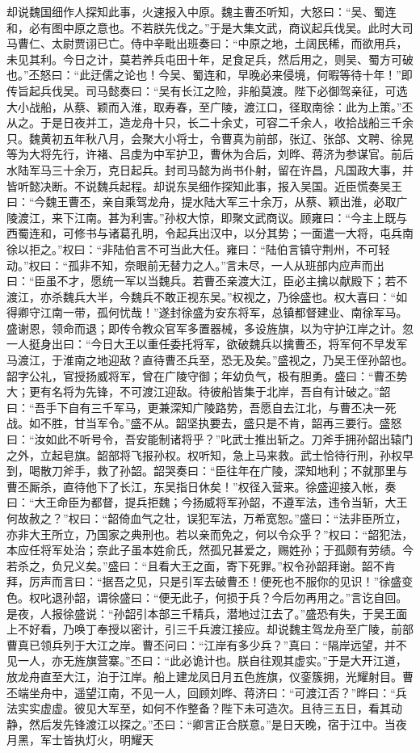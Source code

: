 却说魏国细作人探知此事，火速报入中原。魏主曹丕听知，大怒曰：“吴、蜀连和，必有图中原之意也。不若朕先伐之。”于是大集文武，商议起兵伐吴。此时大司马曹仁、太尉贾诩已亡。侍中辛毗出班奏曰：“中原之地，土阔民稀，而欲用兵，未见其利。今日之计，莫若养兵屯田十年，足食足兵，然后用之，则吴、蜀方可破也。”丕怒曰：“此迂儒之论也！今吴、蜀连和，早晚必来侵境，何暇等待十年！”即传旨起兵伐吴。司马懿奏曰：“吴有长江之险，非船莫渡。陛下必御驾亲征，可选大小战船，从蔡、颖而入淮，取寿春，至广陵，渡江口，径取南徐：此为上策。”丕从之。于是日夜并工，造龙舟十只，长二十余丈，可容二千余人，收拾战船三千余只。魏黄初五年秋八月，会聚大小将士，令曹真为前部，张辽、张郃、文聘、徐晃等为大将先行，许褚、吕虔为中军护卫，曹休为合后，刘晔、蒋济为参谋官。前后水陆军马三十余万，克日起兵。封司马懿为尚书仆射，留在许昌，凡国政大事，并皆听懿决断。不说魏兵起程。却说东吴细作探知此事，报入吴国。近臣慌奏吴王曰：“今魏王曹丕，亲自乘驾龙舟，提水陆大军三十余万，从蔡、颖出淮，必取广陵渡江，来下江南。甚为利害。”孙权大惊，即聚文武商议。顾雍曰：“今主上既与西蜀连和，可修书与诸葛孔明，令起兵出汉中，以分其势；一面遣一大将，屯兵南徐以拒之。”权曰：“非陆伯言不可当此大任。雍曰：“陆伯言镇守荆州，不可轻动。”权曰：“孤非不知，奈眼前无替力之人。”言未尽，一人从班部内应声而出曰：“臣虽不才，愿统一军以当魏兵。若曹丕亲渡大江，臣必主擒以献殿下；若不渡江，亦杀魏兵大半，今魏兵不敢正视东吴。”权视之，乃徐盛也。权大喜曰：“如得卿守江南一带，孤何忧哉！”遂封徐盛为安东将军，总镇都督建业、南徐军马。盛谢恩，领命而退；即传令教众官军多置器械，多设旌旗，以为守护江岸之计。忽一人挺身出曰：“今日大王以重任委托将军，欲破魏兵以擒曹丕，将军何不早发军马渡江，于淮南之地迎敌？直待曹丕兵至，恐无及矣。”盛视之，乃吴王侄孙韶也。韶字公礼，官授扬威将军，曾在广陵守御；年幼负气，极有胆勇。盛曰：“曹丕势大；更有名将为先锋，不可渡江迎敌。待彼船皆集于北岸，吾自有计破之。”韶曰：“吾手下自有三千军马，更兼深知广陵路势，吾愿自去江北，与曹丕决一死战。如不胜，甘当军令。”盛不从。韶坚执要去，盛只是不肯，韶再三要行。盛怒曰：“汝如此不听号令，吾安能制诸将乎？”叱武士推出斩之。刀斧手拥孙韶出辕门之外，立起皂旗。韶部将飞报孙权。权听知，急上马来救。武士恰待行刑，孙权早到，喝散刀斧手，救了孙韶。韶哭奏曰：“臣往年在广陵，深知地利；不就那里与曹丕厮杀，直待他下了长江，东吴指日休矣！”权径入营来。徐盛迎接入帐，奏曰：“大王命臣为都督，提兵拒魏；今扬威将军孙韶，不遵军法，违令当斩，大王何故赦之？”权曰：“韶倚血气之壮，误犯军法，万希宽恕。”盛曰：“法非臣所立，亦非大王所立，乃国家之典刑也。若以亲而免之，何以令众乎？”权曰：“韶犯法，本应任将军处治；奈此子虽本姓俞氏，然孤兄甚爱之，赐姓孙；于孤颇有劳绩。今若杀之，负兄义矣。”盛曰：“且看大王之面，寄下死罪。”权令孙韶拜谢。韶不肯拜，厉声而言曰：“据吾之见，只是引军去破曹丕！便死也不服你的见识！”徐盛变色。权叱退孙韶，谓徐盛曰：“便无此子，何损于兵？今后勿再用之。”言讫自回。是夜，人报徐盛说：“孙韶引本部三千精兵，潜地过江去了。”盛恐有失，于吴王面上不好看，乃唤丁奉授以密计，引三千兵渡江接应。却说魏主驾龙舟至广陵，前部曹真已领兵列于大江之岸。曹丕问曰：“江岸有多少兵？”真曰：“隔岸远望，并不见一人，亦无旌旗营寨。”丕曰：“此必诡计也。朕自往观其虚实。”于是大开江道，放龙舟直至大江，泊于江岸。船上建龙凤日月五色旌旗，仪銮簇拥，光耀射目。曹丕端坐舟中，遥望江南，不见一人，回顾刘晔、蒋济曰：“可渡江否？”晔曰：“兵法实实虚虚。彼见大军至，如何不作整备？陛下未可造次。且待三五日，看其动静，然后发先锋渡江以探之。”丕曰：“卿言正合朕意。”是日天晚，宿于江中。当夜月黑，军士皆执灯火，明耀天
